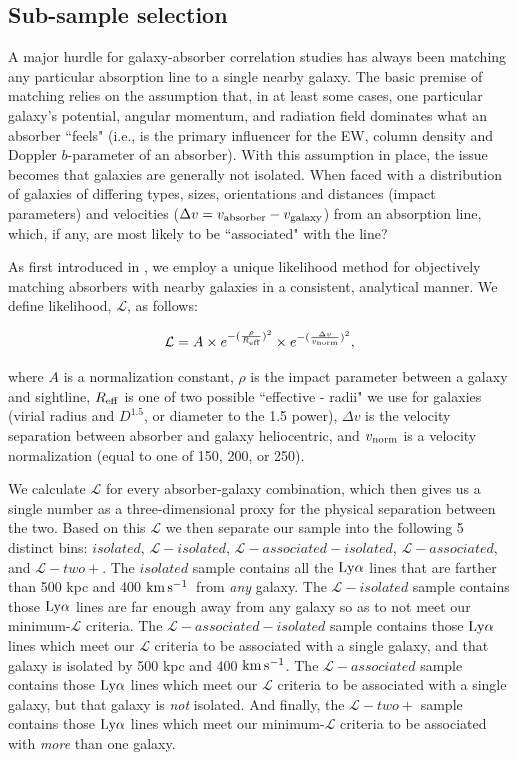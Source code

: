 \documentclass[twocolumn,tighten]{aastex62}
\newcommand{\kms}{$\rm km\, s^{-1}$}
\begin{document}
\subsection{Sub-sample selection}

A major hurdle for galaxy-absorber correlation studies has always been matching any particular absorption line to a single nearby galaxy. The basic premise of matching relies on the assumption that, in at least some cases, one particular galaxy's potential, angular momentum, and radiation field dominates what an absorber ``feels" (i.e., is the primary influencer for the EW, column density and Doppler $b$-parameter of an absorber). With this assumption in place, the issue becomes that galaxies are generally not isolated. When faced with a distribution of galaxies of differing types, sizes, orientations and distances (impact parameters) and velocities ($\Delta v = v_{\rm absorber} - v_{\rm galaxy}$) from an absorption line, which, if any, are most likely to be ``associated" with the line? 

As first introduced in \cite{french2017}, we employ a unique likelihood method for objectively matching absorbers with nearby galaxies in a consistent, analytical manner. We define likelihood, $\mathcal{L}$, as follows: 

\begin{equation}
\mathcal{L} = A \times e^{-(\frac{\rho}{R_{\rm eff}})^2} \times e^{-(\frac{\Delta v}{v_{\rm norm}})^2},
\label{likelihood}
\end{equation}

\noindent where $A$ is a normalization constant, $\rho$ is the impact parameter between a galaxy and sightline, $R_{\rm eff}$ is one of two possible ``effective - radii" we use for galaxies (virial radius and $D^{1.5}$, or diameter to the 1.5 power), $\Delta v$ is the velocity separation between absorber and galaxy heliocentric, and $v_{\rm norm}$ is a velocity normalization (equal to one of 150, 200, or 250). 

We calculate $\mathcal{L}$ for every absorber-galaxy combination, which then gives us a single number as a three-dimensional proxy for the physical separation between the two. Based on this $\mathcal{L}$ we then separate our sample into the following 5 distinct bins: $isolated$, $\mathcal{L}-isolated$, $\mathcal{L}-associated-isolated$, $\mathcal{L}-associated$, and $\mathcal{L}-two+$. The $isolated$ sample contains all the $\rm Ly\alpha$ lines that are farther than 500 kpc and 400 \kms~from \emph{any} galaxy. The $\mathcal{L}-isolated$ sample contains those $\rm Ly\alpha$ lines are far enough away from any galaxy so as to not meet our minimum-$\mathcal{L}$ criteria. The $\mathcal{L}-associated-isolated$ sample contains those $\rm Ly\alpha$ lines which meet our $\mathcal{L}$ criteria to be associated with a single galaxy, and that galaxy is isolated by 500 kpc and 400 \kms. The $\mathcal{L}-associated$ sample contains those $\rm Ly\alpha$ lines which meet our $\mathcal{L}$ criteria to be associated with a single galaxy, but that galaxy is \emph{not} isolated. And finally, the $\mathcal{L}-two+$ sample contains those  $\rm Ly\alpha$ lines which meet our minimum-$\mathcal{L}$ criteria to be associated with \emph{more} than one galaxy.
\end{document}
